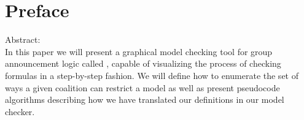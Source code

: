 \section*{Preface}

Abstract: \\
In this paper we will present a graphical model checking tool for group announcement logic called \cname, capable of visualizing the process of checking formulas in a step-by-step fashion. We will define how to enumerate the set of ways a given coalition can restrict a model as well as present pseudocode algorithms describing how we have translated our definitions in our model checker. 


